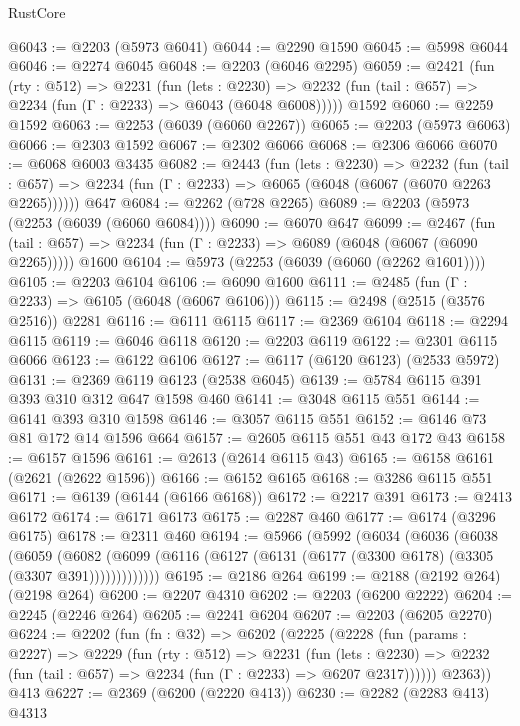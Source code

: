 \begin{lexlean}{RustCore}
\begin{coremodule}
@6043 := @2203 (@5973 @6041)
@6044 := @2290 @1590
@6045 := @5998 @6044
@6046 := @2274 @6045
@6048 := @2203 (@6046 @2295)
@6059 := @2421
    (fun (rty : @512) =>
    @2231
      (fun (lets : @2230) =>
      @2232 (fun (tail : @657) => @2234 (fun (Γ : @2233) => @6043 (@6048 @6008)))))
    @1592
@6060 := @2259 @1592
@6063 := @2253 (@6039 (@6060 @2267))
@6065 := @2203 (@5973 @6063)
@6066 := @2303 @1592
@6067 := @2302 @6066
@6068 := @2306 @6066
@6070 := @6068 @6003 @3435
@6082 := @2443
    (fun (lets : @2230) =>
    @2232
      (fun (tail : @657) => @2234 (fun (Γ : @2233) => @6065 (@6048 (@6067 (@6070 @2263 @2265))))))
    @647
@6084 := @2262 (@728 @2265)
@6089 := @2203 (@5973 (@2253 (@6039 (@6060 @6084))))
@6090 := @6070 @647
@6099 := @2467
    (fun (tail : @657) => @2234 (fun (Γ : @2233) => @6089 (@6048 (@6067 (@6090 @2265)))))
    @1600
@6104 := @5973 (@2253 (@6039 (@6060 (@2262 @1601))))
@6105 := @2203 @6104
@6106 := @6090 @1600
@6111 := @2485 (fun (Γ : @2233) => @6105 (@6048 (@6067 @6106)))
@6115 := @2498 (@2515 (@3576 @2516)) @2281
@6116 := @6111 @6115
@6117 := @2369 @6104
@6118 := @2294 @6115
@6119 := @6046 @6118
@6120 := @2203 @6119
@6122 := @2301 @6115 @6066
@6123 := @6122 @6106
@6127 := @6117 (@6120 @6123) (@2533 @5972)
@6131 := @2369 @6119 @6123 (@2538 @6045)
@6139 := @5784 @6115 @391 @393 @310 @312 @647 @1598 @460
@6141 := @3048 @6115 @551
@6144 := @6141 @393 @310 @1598
@6146 := @3057 @6115 @551
@6152 := @6146 @73 @81 @172 @14 @1596 @664
@6157 := @2605 @6115 @551 @43 @172 @43
@6158 := @6157 @1596
@6161 := @2613 (@2614 @6115 @43)
@6165 := @6158 @6161 (@2621 (@2622 @1596))
@6166 := @6152 @6165
@6168 := @3286 @6115 @551
@6171 := @6139 (@6144 (@6166 @6168))
@6172 := @2217 @391
@6173 := @2413 @6172
@6174 := @6171 @6173
@6175 := @2287 @460
@6177 := @6174 (@3296 @6175)
@6178 := @2311 @460
@6194 := @5966
    (@5992
      (@6034
        (@6036
          (@6038
            (@6059
              (@6082
                (@6099 (@6116 (@6127 (@6131 (@6177 (@3300 @6178) (@3305 (@3307 @391)))))))))))))
@6195 := @2186 @264
@6199 := @2188 (@2192 @264) (@2198 @264)
@6200 := @2207 @4310
@6202 := @2203 (@6200 @2222)
@6204 := @2245 (@2246 @264)
@6205 := @2241 @6204
@6207 := @2203 (@6205 @2270)
@6224 := @2202
    (fun (fn : @32) =>
    @6202
      (@2225
        (@2228
          (fun (params : @2227) =>
          @2229
            (fun (rty : @512) =>
            @2231
              (fun (lets : @2230) =>
              @2232 (fun (tail : @657) => @2234 (fun (Γ : @2233) => @6207 @2317))))))
        @2363))
    @413
@6227 := @2369 (@6200 (@2220 @413))
@6230 := @2282 (@2283 @413) @4313

\end{coremodule}
\end{lexlean}

